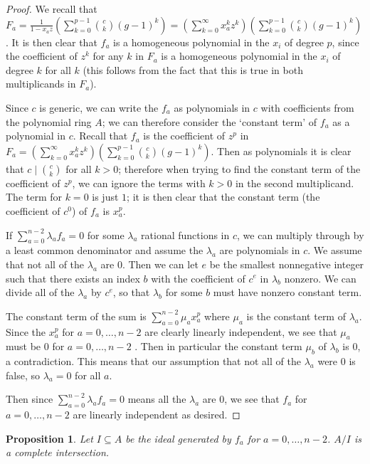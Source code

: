 \documentclass{article}
\numberwithin{equation}{section}
\newtheorem{proposition}[equation]{Proposition}
\begin{document}
\begin{proof} 
We recall that $F_a=\frac{1}{1-x_az}\left(\sum_{k=0}^{p-1} \binom{c}{k} (g-1)^k\right)=\left(\sum_{k=0}^\infty x_a^kz^k\right)\left(\sum_{k=0}^{p-1} \binom{c}{k} (g-1)^k\right)$. It is then clear that $f_a$ is a homogeneous polynomial in the $x_i$ of degree $p$, since the coefficient of $z^k$ for any $k$ in $F_a$ is a homogeneous polynomial in the $x_i$ of degree $k$ for all $k$ (this follows from the fact that this is true in both multiplicands in $F_a$). 

Since $c$ is generic, we can write the $f_a$ as polynomials in $c$ with coefficients from the polynomial ring $A$; we can therefore consider the `constant term' of $f_a$ as a polynomial in $c$. Recall that $f_a$ is the coefficient of $z^p$ in $F_a=\left(\sum_{k=0}^\infty x_a^kz^k\right)\left(\sum_{k=0}^{p-1} \binom{c}{k} (g-1)^k\right)$. Then as polynomials it is clear that $c \mid \binom{c}{k}$ for all $k > 0$; therefore when trying to find the constant term of the coefficient of $z^p$, we can ignore the terms with $k > 0$ in the second multiplicand. The term for $k=0$ is just $1$; it is then clear that the constant term (the coefficient of $c^0$) of $f_a$ is $x_a^p$.

If $\sum_{a=0}^{n-2} \lambda_af_a=0$ for some $\lambda_a$ rational functions in $c$, we can multiply through by a least common denominator and assume the $\lambda_a$ are polynomials in $c$. We assume that not all of the $\lambda_a$ are $0$. Then we can let $e$ be the smallest nonnegative integer such that there exists an index $b$ with the coefficient of $c^e$ in $\lambda_b$ nonzero. We can divide all of the $\lambda_a$ by $c^e$, so that $\lambda_b$ for some $b$ must have nonzero constant term.

The constant term of the sum is $\sum_{a=0}^{n-2}\mu_ax_a^p$ where $\mu_a$ is the constant term of $\lambda_a$. Since the $x_a^p$ for $a=0,\dots,n-2$ are clearly linearly independent, we see that $\mu_a$ must be $0$ for $a=0,\dots,n-2$ . Then in particular the constant term $\mu_b$ of $\lambda_b$ is $0$, a contradiction. This means that our assumption that not all of the $\lambda_a$ were $0$ is false, so $\lambda_a=0$ for all $a$. 

Then since $\sum_{a=0}^{n-2} \lambda_af_a=0$ means all the $\lambda_a$ are $0$, we see that $f_a$ for $a=0,\dots,n-2$ are linearly independent as desired. 

\end{proof}


\begin{proposition}\label{prop:ci} Let $I \subseteq A$ be the ideal generated by $f_a$ for $a=0,\dots,n-2$. $A/I$ is a complete intersection. 
\end{proposition}
\end{document}
